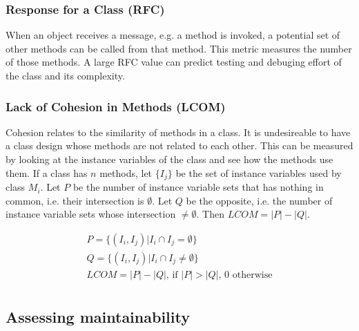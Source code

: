\subsubsection{Response for a Class (RFC)}

When an object receives a message, e.g. a method is invoked, a potential set of
other methods can be called from that method. This metric measures the number
of those methods. A large RFC value can predict testing and debuging effort of
the class and its complexity. \cite{chidamber1994metrics}

\subsubsection{Lack of Cohesion in Methods (LCOM)}

Cohesion relates to the similarity of methods in a class. It is undesireable to
have a class design whose methods are not related to each other. This can be
measured by looking at the instance variables of the class and see how the
methods use them. If a class has $n$ methods, let $\{I_j\}$ be the set of
instance variables used by class $M_i$. Let $P$ be the number of instance
variable sets that has nothing in common, i.e. their intersection is
$\emptyset$. Let $Q$ be the opposite, i.e. the number of instance variable sets
whose intersection $\neq \emptyset$. Then $LCOM = |P| - |Q|$.
\cite{chidamber1994metrics}

\begin{gather*}
P = \{(I_i, I_j) | I_i \cap I_j = \emptyset\} \\
Q = \{(I_i, I_j) | I_i \cap I_j \neq \emptyset\} \\
LCOM = |P| - |Q| \text{, if $|P| > |Q|$, 0 otherwise} \\
\end{gather*}


\subsection{Assessing maintainability}

